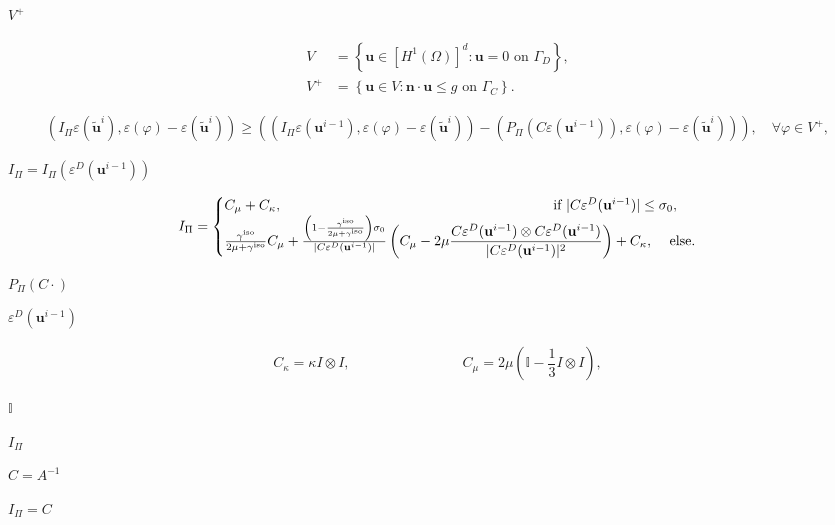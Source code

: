 \documentclass{article}
\begin{document}
$V^+$
\pagebreak

\begin{align*} V &= \left\{ \mathbf u\in \left[H^1(\Omega)\right]^{d}: \mathbf u = 0 \text{ on } \Gamma_D\right\}, \\ V^+ &= \left\{ \mathbf u\in V: \mathbf n \cdot \mathbf u\leq g \text{ on } \Gamma_C \right\}. \end{align*}
\pagebreak

\begin{align*} \label{eq:linearization} \left(I_{\Pi}\varepsilon(\tilde {\mathbf u}^{i}), \varepsilon(\varphi) - \varepsilon(\tilde {\mathbf u}^{i})\right) \geq \left(\left(I_{\Pi}\varepsilon({\mathbf u}^{i-1}), \varepsilon(\varphi) - \varepsilon(\tilde {\mathbf u}^{i})\right) - \left(P_{\Pi}(C\varepsilon({\mathbf u}^{i-1})), \varepsilon(\varphi) - \varepsilon(\tilde {\mathbf u}^{i})\right)\right), \quad \forall \varphi\in V^+, \end{align*}
\pagebreak

$I_\Pi=I_\Pi(\varepsilon^D(\mathbf u^{i-1}))$
\pagebreak

\begin{align} I_\Pi = \begin{cases} C_{\mu} + C_{\kappa}, & \hspace{-8em} \text{if } \vert C\varepsilon^D(\mathbf u^{i-1}) \vert \leq \sigma_0, \\ \frac{\gamma^{\text{iso}}}{2\mu + \gamma^{\text{iso}}} C_{\mu} + \frac{\left(1-\frac{\gamma^{\text{iso}}}{2\mu + \gamma^{\text{iso}}}\right)\sigma_0}{\vert C\varepsilon^D(\mathbf u^{i-1}) \vert}\left(C_{\mu} - 2\mu\dfrac{C\varepsilon^D(\mathbf u^{i-1})\otimes C\varepsilon^D(\mathbf u^{i-1})}{\vert C\varepsilon^D(\mathbf u^{i-1})\vert^2}\right) + C_{\kappa}, & \text{ else.} \end{cases} \end{align}
\pagebreak

$P_\Pi(C\cdot)$
\pagebreak

$\varepsilon^D(\mathbf u^{i-1})$
\pagebreak

\begin{gather*} C_{\kappa} = \kappa I\otimes I, \qquad\qquad\qquad\qquad C_{\mu} = 2\mu\left(\mathbb{I} - \dfrac{1}{3} I\otimes I\right), \end{gather*}
\pagebreak

$\mathbb{I}$
\pagebreak

$I_\Pi$
\pagebreak

$C=A^{-1}$
\pagebreak

$I_\Pi=C$
\pagebreak
\end{document}
